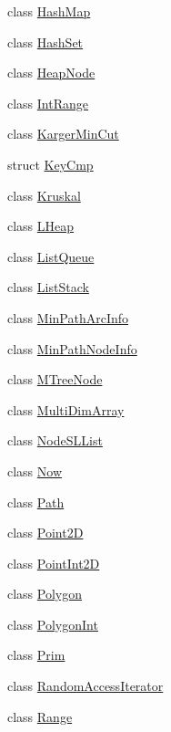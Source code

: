 \begin{DoxyCompactItemize}
\item 
class \hyperlink{class_designar_1_1_hash_map}{Hash\+Map}
\item 
class \hyperlink{class_designar_1_1_hash_set}{Hash\+Set}
\item 
class \hyperlink{class_designar_1_1_heap_node}{Heap\+Node}
\item 
class \hyperlink{class_designar_1_1_int_range}{Int\+Range}
\item 
class \hyperlink{class_designar_1_1_karger_min_cut}{Karger\+Min\+Cut}
\item 
struct \hyperlink{struct_designar_1_1_key_cmp}{Key\+Cmp}
\item 
class \hyperlink{class_designar_1_1_kruskal}{Kruskal}
\item 
class \hyperlink{class_designar_1_1_l_heap}{L\+Heap}
\item 
class \hyperlink{class_designar_1_1_list_queue}{List\+Queue}
\item 
class \hyperlink{class_designar_1_1_list_stack}{List\+Stack}
\item 
class \hyperlink{class_designar_1_1_min_path_arc_info}{Min\+Path\+Arc\+Info}
\item 
class \hyperlink{class_designar_1_1_min_path_node_info}{Min\+Path\+Node\+Info}
\item 
class \hyperlink{class_designar_1_1_m_tree_node}{M\+Tree\+Node}
\item 
class \hyperlink{class_designar_1_1_multi_dim_array}{Multi\+Dim\+Array}
\item 
class \hyperlink{class_designar_1_1_node_s_l_list}{Node\+S\+L\+List}
\item 
class \hyperlink{class_designar_1_1_now}{Now}
\item 
class \hyperlink{class_designar_1_1_path}{Path}
\item 
class \hyperlink{class_designar_1_1_point2_d}{Point2D}
\item 
class \hyperlink{class_designar_1_1_point_int2_d}{Point\+Int2D}
\item 
class \hyperlink{class_designar_1_1_polygon}{Polygon}
\item 
class \hyperlink{class_designar_1_1_polygon_int}{Polygon\+Int}
\item 
class \hyperlink{class_designar_1_1_prim}{Prim}
\item 
class \hyperlink{class_designar_1_1_random_access_iterator}{Random\+Access\+Iterator}
\item 
class \hyperlink{class_designar_1_1_range}{Range}
\item 

\end{DoxyCompactItemize}
